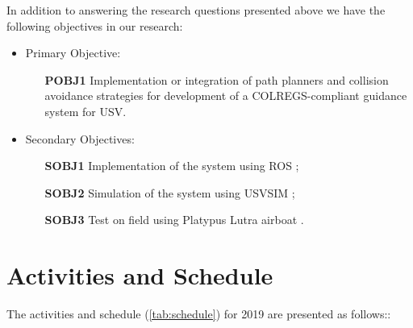         In addition to answering the research questions presented above we have the following objectives in our research:
        \newline
        
        \begin{center}
        \begin{itemize}
            \item Primary Objective:
                \begin{itemize}
                    \item [\textbf{POBJ1}] Implementation or integration of path planners and collision avoidance strategies for development of a \ac{COLREGS}-compliant guidance system for \ac{USV}.
                \end{itemize}
            \item Secondary Objectives:
                \begin{itemize}
                    \item [\textbf{SOBJ1}] Implementation of the system using \acf{ROS} \cite{Quigley2009ROS};
                    \item [\textbf{SOBJ2}] Simulation of the system using USVSIM \cite{Paravisi2018Toward};
                    \item [\textbf{SOBJ3}] Test on field using Platypus Lutra airboat \cite{PlatypusLutraAirboat}.
                \end{itemize}
        \end{itemize}
        \end{center}

    \section{Activities and Schedule}
    \label{subsec:activities_and_schedule}
        The activities and schedule (\ref{tab:schedule}) for 2019 are presented as follows::
        
